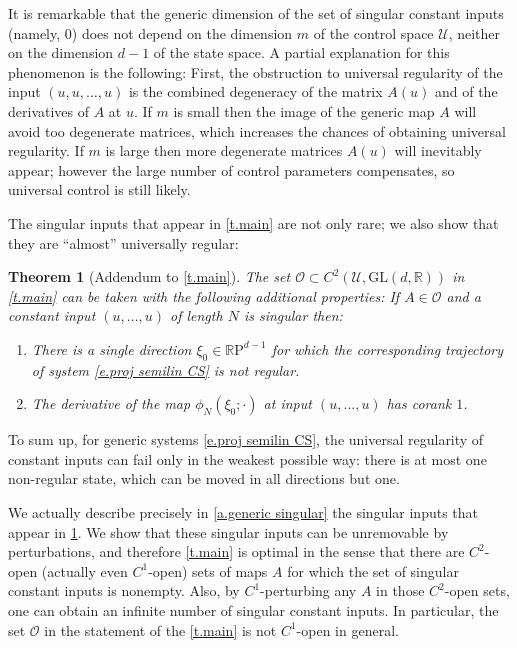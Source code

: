 \documentclass[10pt, a4paper]{amsart}
\theoremstyle{plain}
\newtheorem{thm}[lemma]{Theorem}
\theoremstyle{definition}
\theoremstyle{remark}
\theoremstyle{note}
\numberwithin{equation}{section}
\begin{document}
It is remarkable that the generic dimension of the set of singular constant inputs (namely, $0$) does not depend on the dimension $m$ of the control space ${\mathcal{U}}$, neither on the dimension $d-1$ of the state space. A partial explanation for this phenomenon is the following: 
First, the obstruction to universal regularity of the input $(u,u,\dots,u)$ is the combined degeneracy of the matrix $A(u)$ and of the derivatives of $A$ at $u$.
If $m$ is small then the image of the generic map $A$ will avoid too degenerate matrices, which increases the chances of obtaining universal regularity. If $m$ is large then more degenerate matrices $A(u)$ will inevitably appear; however the large number of control parameters compensates, so universal control is still likely.

\medskip

The singular inputs that appear in \cref{t.main} are not only rare;
we also show that they are ``almost'' universally regular:

\begin{thm}[Addendum to \cref{t.main}]\label{t.addendum}
The set ${\mathcal{O}} \subset C^2({\mathcal{U}},{\mathrm{GL}}(d,{\mathbb{R}}))$ in \cref{t.main} 
can be taken with the following additional properties:
If $A \in {\mathcal{O}}$ and a constant input $(u,\dots,u)$ of length $N$ is singular then:
\begin{enumerate}
\item \label{i.addendum_1} 
There is a single direction $\xi_0 \in {\mathbb{R}\mathrm{P}}^{d-1}$ for which
the corresponding trajectory of system \eqref{e.proj semilin CS} is not regular.
\item \label{i.addendum_2}
The derivative of the map $\phi_N(\xi_0; \cdot)$ at input $(u,\dots,u)$
has corank $1$.
\end{enumerate}
\end{thm}

To sum up, for generic systems \eqref{e.proj semilin CS}, the universal regularity of constant inputs 
can fail only in the weakest possible way: there is at most one non-regular state, 
which can be moved in all directions but one.

We actually describe precisely in \cref{a.generic singular} the singular inputs that appear in \cref{t.addendum}. 
We show that these singular inputs can be unremovable by perturbations,
and therefore \cref{t.main} is optimal in the sense that there are $C^2$-open (actually even $C^1$-open) sets of maps $A$ for which the set of singular constant inputs is nonempty.
Also, by $C^1$-perturbing any $A$ in those $C^2$-open sets,
one can obtain an infinite number of singular constant inputs.
In particular, the set ${\mathcal{O}}$ in the statement of the \cref{t.main} is not $C^1$-open in general.
\end{document}
